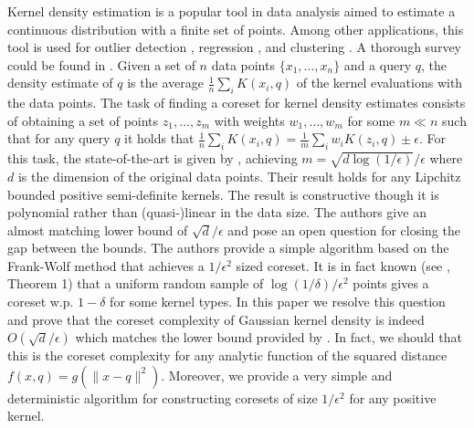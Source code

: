 \documentclass[anon,12pt]{colt2019} %
\newcommand{\eps}{\epsilon}
\begin{document}
Kernel density estimation is a popular tool in data analysis aimed to estimate a continuous distribution with a finite set of points. Among other applications, this tool is used for outlier detection \cite{schubert2014generalized}, regression \cite{fan2018local}, and clustering \cite{rinaldo2010generalized}. A thorough survey could be found in \cite{silverman2018density}. Given a set of $n$ data points $\{x_1,\ldots,x_n\}$ and a query $q$, the density estimate of $q$ is the average $\frac{1}{n} \sum_i K(x_i,q)$ of the kernel evaluations with the data points. The task of finding a coreset for kernel density estimates consists of obtaining a set of points $z_1,\ldots,z_m$ with weights $w_1,\ldots,w_m$ for some $m \ll n$ such that for any query $q$ it holds that 
$\frac{1}{n} \sum_i K(x_i,q) = \frac{1}{m} \sum_i w_i K(z_i,q) \pm \eps$. For this task, the state-of-the-art is given by \cite{DBLP:journals/corr/abs-1802-01751}, achieving $m=\sqrt{d\log(1/\eps)}/\eps$ where $d$ is the dimension of the original data points. Their result holds for any Lipchitz bounded positive semi-definite kernels. The result is constructive though it is polynomial rather than (quasi-)linear in the data size. The authors give an almost matching lower bound of $\sqrt{d}/\eps$ and pose an open question for closing the gap between the bounds. The authors provide a simple algorithm based on the Frank-Wolf method that achieves a $1/\eps^2$ sized coreset. It is in fact known (see \cite{lopez2015towards}, Theorem 1) that a uniform random sample of $\log(1/\delta)/\eps^2$ points gives a coreset w.p. $1-\delta$ for some kernel types. 
In this paper we resolve this question and prove that the coreset complexity of Gaussian kernel density is indeed $O(\sqrt{d}/\eps)$ which matches the lower bound provided by \cite{DBLP:journals/corr/abs-1802-01751}. 
In fact, we should that this is the coreset complexity for any analytic function of the squared distance $f(x,q) = g(\|x-q\|^2)$.
Moreover, we provide a very simple and deterministic algorithm for constructing coresets of size $1/\eps^2$ for any positive kernel.
\end{document}
